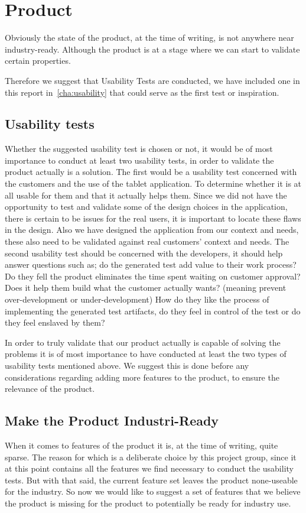 \section{Product}
Obviously the state of the product, at the time of writing, is not anywhere near industry-ready.
Although the product is at a stage where we can start to validate certain properties.

Therefore we suggest that Usability Tests are conducted, we have included one in this report in~\autoref{cha:usability} that could serve as the first test or inspiration.

\subsection{Usability tests}
Whether the suggested usability test is chosen or not, it would be of most importance to conduct at least two usability tests, in order to validate the product actually is a solution.
The first would be a usability test concerned with the customers and the use of the tablet application.
To determine whether it is at all usable for them and that it actually helps them.
Since we did not have the opportunity to test and validate some of the design choices in the application, there is certain to be issues for the real users, it is important to locate these flaws in the design.
Also we have designed the application from our context and needs, these also need to be validated against real customers' context and needs.
The second usability test should be concerned with the developers, it should help answer questions such as; do the generated test add value to their work process? 
Do they fell the product eliminates the time spent waiting on customer approval?
Does it help them build what the customer actually wants? (meaning prevent over-development or under-development)
How do they like the process of implementing the generated test artifacts, do they feel in control of the test or do they feel enslaved by them?

In order to truly validate that our product actually is capable of solving the problems it is of most importance to have conducted at least the two types of usability tests mentioned above.
We suggest this is done before any considerations regarding adding more features to the product, to ensure the relevance of the product.

\subsection{Make the Product Industri-Ready}
When it comes to features of the product it is, at the time of writing, quite sparse.
The reason for which is a deliberate choice by this project group, since it at this point contains all the features we find necessary to conduct the usability tests.
But with that said, the current feature set leaves the product none-useable for the industry.
So now we would like to suggest a set of features that we believe the product is missing for the product to potentially be ready for industry use.

